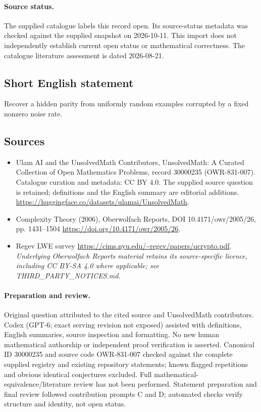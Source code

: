 \documentclass[11pt]{article}
\begin{document}
\paragraph{Source status.}
The supplied catalogue labels this record open. Its source-status metadata was checked against the supplied snapshot on 2026-10-11. This import does not independently establish current open status or mathematical correctness. The catalogue literature assessment is dated 2026-08-21.
\subsection{Short English statement}
Recover a hidden parity from uniformly random examples corrupted by a fixed nonzero noise rate.
\subsection{Sources}
\begin{itemize}
\item[\hypertarget{source:30000235:1}{S1}] Ulam AI and the UnsolvedMath Contributors, UnsolvedMath: A Curated Collection of Open Mathematics Problems, record 30000235 (OWR-831-007). Catalogue curation and metadata: CC BY 4.0. The supplied source question is retained; definitions and the English summary are editorial additions.
\url{https://huggingface.co/datasets/ulamai/UnsolvedMath}.
\item[\hypertarget{source:30000235:2}{S2}] Complexity Theory (2006), Oberwolfach Reports, DOI 10.4171/owr/2005/26, pp. 1431--1504
\url{https://doi.org/10.4171/owr/2005/26}.
\item[\hypertarget{source:30000235:3}{S3}] Regev LWE survey
\url{https://cims.nyu.edu/~regev/papers/qcrypto.pdf}.
\textit{Underlying Oberwolfach Reports material retains its source-specific licence, including CC BY-SA 4.0 where applicable; see THIRD\_PARTY\_NOTICES.md.}
\end{itemize}
\paragraph{Preparation and review.}
Original question attributed to the cited source and UnsolvedMath contributors. Codex (GPT-6; exact serving revision not exposed) assisted with definitions, English summaries, source inspection and formatting. No new human mathematical authorship or independent proof verification is asserted. Canonical ID 30000235 and source code OWR-831-007 checked against the complete supplied registry and existing repository statements; known flagged repetitions and obvious identical conjectures excluded. Full mathematical-equivalence/literature review has not been performed. Statement preparation and final review followed contribution prompts C and D; automated checks verify structure and identity, not open status.
\label{end:30000235}
\end{document}
